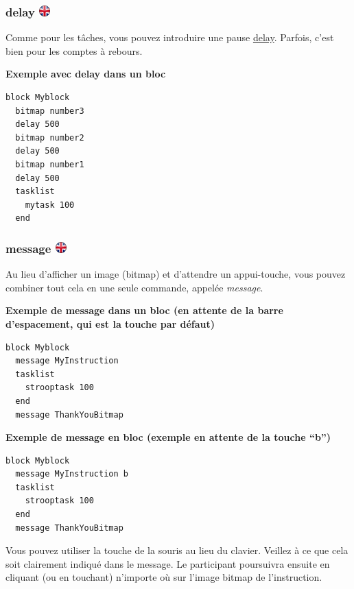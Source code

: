 \documentclass[
]{book}
\begin{document}
\hypertarget{delay-1}{%
\subsubsection[delay ]{\texorpdfstring{delay
\href{https://www.psytoolkit.org/doc3.2.0/syntax.html\#block-delay}{\protect\includegraphics{img/ukflag.png}}}{delay }}\label{delay-1}}

Comme pour les tâches, vous pouvez introduire une pause
\protect\hyperlink{delay}{delay}. Parfois, c'est bien pour les comptes à
rebours.

\textbf{Exemple avec delay dans un bloc}

\begin{verbatim}
block Myblock
  bitmap number3
  delay 500
  bitmap number2
  delay 500
  bitmap number1
  delay 500
  tasklist
    mytask 100
  end
\end{verbatim}

\hypertarget{message}{%
\subsubsection[message ]{\texorpdfstring{message
\href{https://www.psytoolkit.org/doc3.2.0/syntax.html\#block-message}{\protect\includegraphics{img/ukflag.png}}}{message }}\label{message}}

Au lieu d'afficher un image (bitmap) et d'attendre un appui-touche, vous
pouvez combiner tout cela en une seule commande, appelée \emph{message}.

\textbf{Exemple de message dans un bloc (en attente de la barre
d'espacement, qui est la touche par défaut)}

\begin{verbatim}
block Myblock
  message MyInstruction
  tasklist
    strooptask 100
  end
  message ThankYouBitmap
\end{verbatim}

\textbf{Exemple de message en bloc (exemple en attente de la touche
``b'')}

\begin{verbatim}
block Myblock
  message MyInstruction b
  tasklist
    strooptask 100
  end
  message ThankYouBitmap
\end{verbatim}

Vous pouvez utiliser la touche de la souris au lieu du clavier. Veillez
à ce que cela soit clairement indiqué dans le message. Le participant
poursuivra ensuite en cliquant (ou en touchant) n'importe où sur l'image
bitmap de l'instruction.
\end{document}

